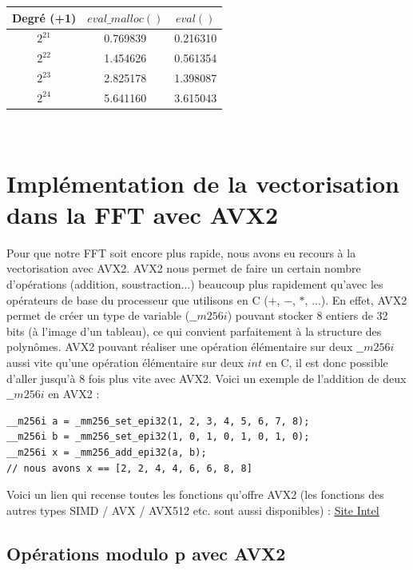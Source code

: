 \documentclass[12pt, a4paper]{article}
\begin{document}
\begin{center}
\begin{tabular}{||c c c||}
\hline
Degré (+1) & $eval\_malloc()$ & $eval()$ \\
\hline\hline
$2^{21}$ & 0.769839 & 0.216310 \\
\hline
$2^{22}$ & 1.454626 & 0.561354 \\
\hline
$2^{23}$ & 2.825178 & 1.398087 \\
\hline
$2^{24}$ & 5.641160 & 3.615043 \\
\hline
\end{tabular}
\end{center}
{}
\ \\
\newpage
\section{Implémentation de la vectorisation dans la FFT avec AVX2}

Pour que notre FFT soit encore plus rapide, nous avons eu recours à la vectorisation avec AVX2. AVX2 nous permet de faire un certain nombre d'opérations (addition, soustraction...) beaucoup plus rapidement qu'avec les opérateurs de base du processeur que utilisons \linebreak en C ($+$, $-$, $*$, ...). En effet, AVX2 permet de créer un type de variable ($\_\_m256i$) pouvant stocker 8 entiers de 32 bits (à l'image d'un tableau), ce qui convient parfaitement à la structure des polynômes. AVX2 pouvant réaliser une opération élémentaire sur deux $\_\_m256i$ aussi vite qu'une opération élémentaire sur deux $int$ en C, il est donc possible d'aller jusqu'à 8 fois plus vite avec AVX2. Voici un exemple de l'addition de deux $\_\_m256i$ en AVX2 : \\
{\begin{lstlisting}
__m256i a = _mm256_set_epi32(1, 2, 3, 4, 5, 6, 7, 8);
__m256i b = _mm256_set_epi32(1, 0, 1, 0, 1, 0, 1, 0);
__m256i x = _mm256_add_epi32(a, b);
// nous avons x == [2, 2, 4, 4, 6, 6, 8, 8]
\end{lstlisting}}

\indent Voici un lien qui recense toutes les fonctions qu'offre AVX2 (les fonctions des  autres types SIMD / AVX / AVX512 etc. sont aussi disponibles) : \href{https://www.intel.com/content/www/us/en/docs/intrinsics-guide/index.html#techs=AVX,AVX2}{\underline{\color{blue}Site Intel}}

\subsection{Opérations modulo p avec AVX2}
\end{document}
